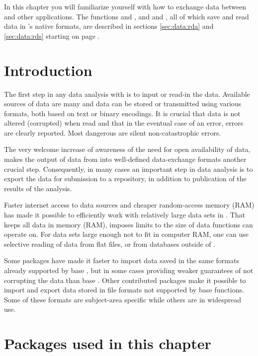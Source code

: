 \documentclass[krantz2]{krantz}\usepackage{knitr}
\begin{document}
In this chapter you will familiarize yourself with how to exchange data between \Rlang and other applications. The functions  and , and  and  , all of which save and read data in \Rlang's native formats, are described in sections \ref{sec:data:rda} and \ref{sec:data:rds} starting on page \pageref{sec:data:rda}.

\section{Introduction}

The first step in any data analysis with \Rlang is to input or read-in the data. Available sources of data are many and data can be stored or transmitted using various formats, both based on text or binary encodings. It is crucial that data is not altered (corrupted) when read and that in the eventual case of an error, errors are clearly reported. Most dangerous are silent non-catastrophic errors.

The very welcome increase of awareness of the need for open availability of data, makes the output of data from \Rlang into well-defined data-exchange formats another crucial step. Consequently, in many cases an important step in data analysis is to export the data for submission to a repository, in addition to publication of the results of the analysis.

Faster internet access to data sources and cheaper random-access memory (RAM) has made it possible to efficiently work with relatively large data sets in \Rlang. That \Rlang keeps all data in memory (RAM), imposes limits to the size of data \Rlang functions can operate on. For data sets large enough not to fit in computer RAM, one can use selective reading of data from flat files, or from databases outside of \Rlang.

Some \Rlang packages have made it faster to import data saved in the same formats already supported by base \Rlang, but in some cases providing weaker guarantees of not corrupting the data than base \Rlang. Other contributed packages make it possible to import and export data stored in file formats not supported by base \Rlang functions. Some of these formats are subject-area specific while others are in widespread use.

\section{Packages used in this chapter}
\end{document}
